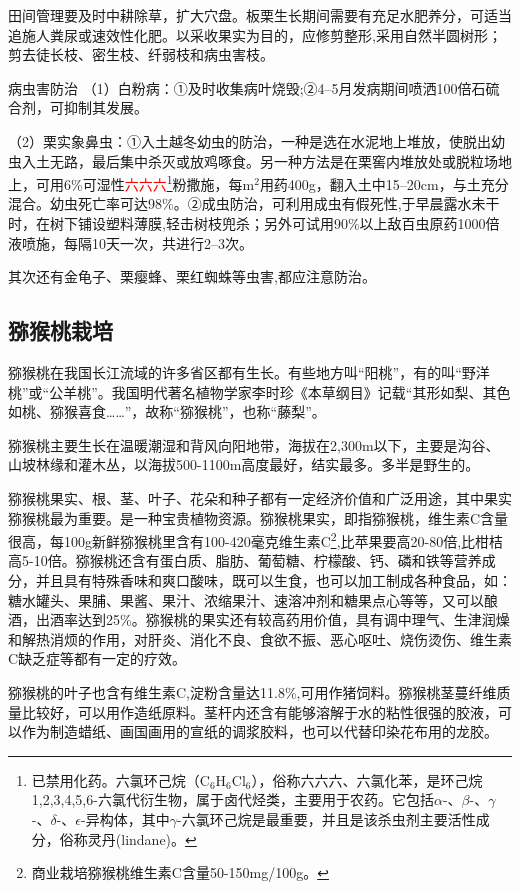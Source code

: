 \documentclass{ctexbook}
\begin{document}
田间管理要及时中耕除草，扩大穴盘。板栗生长期间需要有充足水肥养分，可适当追施人粪尿或速效性化肥。以采收果实为目的，应修剪整形,采用自然半圆树形；剪去徒长枝、密生枝、纤弱枝和病虫害枝。

病虫害防治
（1）白粉病：①及时收集病叶烧毁;②4--5月发病期间喷洒100倍石硫合剂，可抑制其发展。

（2）栗实象鼻虫：①入土越冬幼虫的防治，一种是选在水泥地上堆放，使脱出幼虫入土无路，最后集中杀灭或放鸡啄食。另一种方法是在栗窖内堆放处或脱粒场地上，可用6\%可湿性\textcolor{red}{六六六}\footnote{已禁用化药。六氯环己烷（C$_6$H$_6$Cl$_6$），俗称六六六、六氯化苯，是环己烷1,2,3,4,5,6-六氯代衍生物，属于卤代烃类，主要用于农药。它包括$\alpha$-、$\beta$-、$\gamma$-、$\delta$-、$\epsilon$-异构体，其中$\gamma$-六氯环己烷是最重要，并且是该杀虫剂主要活性成分，俗称灵丹(lindane)。}粉撒施，每m$^2$用药400g，翻入土中15--20cm，与土充分混合。幼虫死亡率可达98\%。②成虫防治，可利用成虫有假死性,于早晨露水未干时，在树下铺设塑料薄膜,轻击树枝兜杀；另外可试用90\%以上敌百虫原药1000倍液喷施，每隔10天一次，共进行2--3次。

其次还有金龟子、栗瘿蜂、栗红蜘蛛等虫害,都应注意防治。
\subsection{猕猴桃栽培}
猕猴桃在我国长江流域的许多省区都有生长。有些地方叫“阳桃”，有的叫“野洋桃”或“公羊桃”。我国明代著名植物学家李时珍《本草纲目》记载“其形如梨、其色如桃、猕猴喜食……”，故称“猕猴桃”，也称“藤梨”。

猕猴桃主要生长在温暖潮湿和背风向阳地带，海拔在2,300m以下，主要是沟谷、山坡林缘和灌木丛，以海拔500-1100m高度最好，结实最多。多半是野生的。

猕猴桃果实、根、茎、叶子、花朵和种子都有一定经济价值和广泛用途，其中果实猕猴桃最为重要。是一种宝贵植物资源。猕猴桃果实，即指猕猴桃，维生素C含量很高，每100g新鲜猕猴桃里含有100-420毫克维生素C\footnote{商业栽培猕猴桃维生素C含量50-150mg/100g。},比苹果要高20-80倍,比柑桔高5-10倍。猕猴桃还含有蛋白质、脂肪、葡萄糖、柠檬酸、钙、磷和铁等营养成分，并且具有特殊香味和爽口酸味，既可以生食，也可以加工制成各种食品，如：糖水罐头、果脯、果酱、果汁、浓缩果汁、速溶冲剂和糖果点心等等，又可以酿酒，出酒率达到25\%。猕猴桃的果实还有较高药用价值，具有调中理气、生津润燥和解热消烦的作用，对肝炎、消化不良、食欲不振、恶心呕吐、烧伤烫伤、维生素C缺乏症等都有一定的疗效。

猕猴桃的叶子也含有维生素C,淀粉含量达11.8\%,可用作猪饲料。猕猴桃茎蔓纤维质量比较好，可以用作造纸原料。茎杆内还含有能够溶解于水的粘性很强的胶液，可以作为制造蜡纸、画国画用的宣纸的调浆胶料，也可以代替印染花布用的龙胶。
\end{document}
